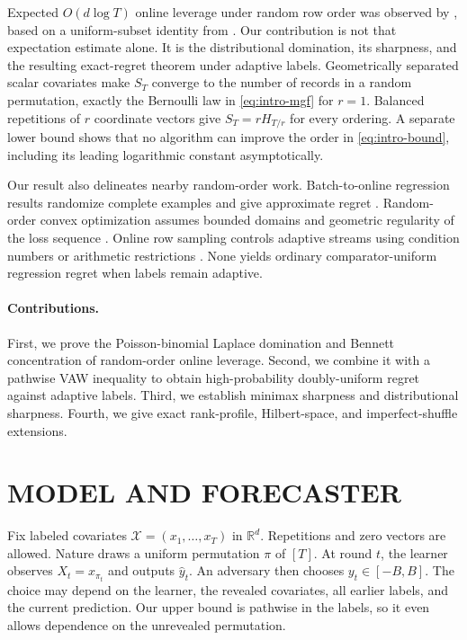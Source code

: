 \documentclass[twoside]{article}
\newcommand{\R}{\mathbb R}
\begin{document}
Expected $O(d\log T)$ online leverage under random row order was observed by \citet{cohen2020online}, based on a uniform-subset identity from \citet{cohen2015dimensionality}. Our contribution is not that expectation estimate alone. It is the distributional domination, its sharpness, and the resulting exact-regret theorem under adaptive labels. Geometrically separated scalar covariates make $S_T$ converge to the number of records in a random permutation, exactly the Bernoulli law in \eqref{eq:intro-mgf} for $r=1$. Balanced repetitions of $r$ coordinate vectors give $S_T=rH_{T/r}$ for every ordering. A separate lower bound shows that no algorithm can improve the order in \eqref{eq:intro-bound}, including its leading logarithmic constant asymptotically.

Our result also delineates nearby random-order work. Batch-to-online regression results randomize complete examples and give approximate regret \citep{dong2023batch,sakaue2026sensitivity}. Random-order convex optimization assumes bounded domains and geometric regularity of the loss sequence \citep{garber2020online,sherman2021optimal}. Online row sampling controls adaptive streams using condition numbers or arithmetic restrictions \citep{goranci2026sparsification}. None yields ordinary comparator-uniform regression regret when labels remain adaptive.

\paragraph{Contributions.}
First, we prove the Poisson-binomial Laplace domination and Bennett concentration of random-order online leverage. Second, we combine it with a pathwise VAW inequality to obtain high-probability doubly-uniform regret against adaptive labels. Third, we establish minimax sharpness and distributional sharpness. Fourth, we give exact rank-profile, Hilbert-space, and imperfect-shuffle extensions.

\section{MODEL AND FORECASTER}
\label{sec:model}

Fix labeled covariates $\mathcal X=(x_1,\ldots,x_T)$ in $\R^d$. Repetitions and zero vectors are allowed. Nature draws a uniform permutation $\pi$ of $[T]$. At round $t$, the learner observes $X_t=x_{\pi_t}$ and outputs $\widehat y_t$. An adversary then chooses $y_t\in[-B,B]$. The choice may depend on the learner, the revealed covariates, all earlier labels, and the current prediction. Our upper bound is pathwise in the labels, so it even allows dependence on the unrevealed permutation.
\end{document}
